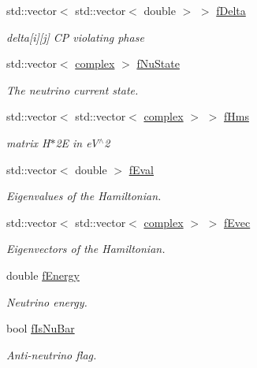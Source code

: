 \begin{DoxyCompactItemize}
std\+::vector$<$ std\+::vector$<$ double $>$ $>$ \hyperlink{classOscProb_1_1PMNS__Base_ab2a5fa40e689b221c8a7d2c17213810d}{f\+Delta}
\begin{DoxyCompactList}\small\item\em delta\mbox{[}i\mbox{]}\mbox{[}j\mbox{]} CP violating phase \end{DoxyCompactList}\item 
std\+::vector$<$ \hyperlink{classOscProb_1_1PMNS__Base_ae86ec4718808ce9d02e5f5b4226714ab}{complex} $>$ \hyperlink{classOscProb_1_1PMNS__Base_ad38a7107c3ab393591fd5ba21658300b}{f\+Nu\+State}
\begin{DoxyCompactList}\small\item\em The neutrino current state. \end{DoxyCompactList}\item 
std\+::vector$<$ std\+::vector$<$ \hyperlink{classOscProb_1_1PMNS__Base_ae86ec4718808ce9d02e5f5b4226714ab}{complex} $>$ $>$ \hyperlink{classOscProb_1_1PMNS__Base_adf5901166216e8c7a5cff2092952f473}{f\+Hms}
\begin{DoxyCompactList}\small\item\em matrix H$\ast$2E in e\+V$^\wedge$2 \end{DoxyCompactList}\item 
std\+::vector$<$ double $>$ \hyperlink{classOscProb_1_1PMNS__Base_a6319c34d7decbb9d7d6da279c06e8c2d}{f\+Eval}
\begin{DoxyCompactList}\small\item\em Eigenvalues of the Hamiltonian. \end{DoxyCompactList}\item 
std\+::vector$<$ std\+::vector$<$ \hyperlink{classOscProb_1_1PMNS__Base_ae86ec4718808ce9d02e5f5b4226714ab}{complex} $>$ $>$ \hyperlink{classOscProb_1_1PMNS__Base_a093e7bd31d4ef52ed52df414e12c1d17}{f\+Evec}
\begin{DoxyCompactList}\small\item\em Eigenvectors of the Hamiltonian. \end{DoxyCompactList}\item 
double \hyperlink{classOscProb_1_1PMNS__Base_a2800af6d436972f3e900867790c046b0}{f\+Energy}
\begin{DoxyCompactList}\small\item\em Neutrino energy. \end{DoxyCompactList}\item 
bool \hyperlink{classOscProb_1_1PMNS__Base_a0ebaeaefab36a3ff381c6293faedfdd6}{f\+Is\+Nu\+Bar}
\begin{DoxyCompactList}\small\item\em Anti-\/neutrino flag. \end{DoxyCompactList}\item 

\end{DoxyCompactItemize}
